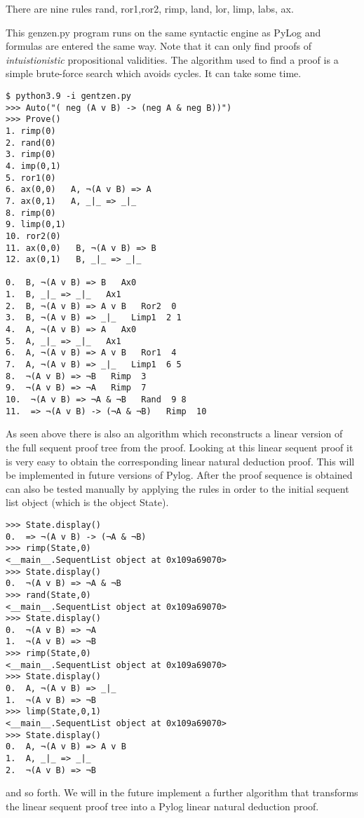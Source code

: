 \documentclass[12pt,leqno]{article}
\numberwithin{equation}{section}
\begin{document}
There are nine rules rand, ror1,ror2, rimp, land, lor, limp, labs, ax.

This genzen.py program runs on the same syntactic engine as PyLog and formulas are entered the same way. Note that it can only find proofs of \emph{intuistionistic} propositional validities.
The  algorithm  used to find a proof is a simple brute-force search which avoids cycles. It can take some time.

\begin{verbatim}
$ python3.9 -i gentzen.py
>>> Auto("( neg (A v B) -> (neg A & neg B))")
>>> Prove()
1. rimp(0)
2. rand(0)
3. rimp(0)
4. imp(0,1)
5. ror1(0)
6. ax(0,0)   A, ¬(A v B) => A
7. ax(0,1)   A, _|_ => _|_
8. rimp(0)
9. limp(0,1)
10. ror2(0)
11. ax(0,0)   B, ¬(A v B) => B
12. ax(0,1)   B, _|_ => _|_

0.  B, ¬(A v B) => B   Ax0  
1.  B, _|_ => _|_   Ax1  
2.  B, ¬(A v B) => A v B   Ror2  0 
3.  B, ¬(A v B) => _|_   Limp1  2 1 
4.  A, ¬(A v B) => A   Ax0  
5.  A, _|_ => _|_   Ax1  
6.  A, ¬(A v B) => A v B   Ror1  4 
7.  A, ¬(A v B) => _|_   Limp1  6 5 
8.  ¬(A v B) => ¬B   Rimp  3 
9.  ¬(A v B) => ¬A   Rimp  7 
10.  ¬(A v B) => ¬A & ¬B   Rand  9 8 
11.  => ¬(A v B) -> (¬A & ¬B)   Rimp  10 
\end{verbatim}

As seen above there  is also an algorithm which reconstructs a linear version of the full sequent proof tree from the proof. Looking at this
linear sequent proof it is very easy to obtain the corresponding linear natural deduction proof. This will be implemented in future versions of Pylog.
After the  proof sequence  is obtained can also be tested manually by applying the rules in order to the initial
sequent list object (which is the object State).

\begin{verbatim}
>>> State.display()
0.  => ¬(A v B) -> (¬A & ¬B)
>>> rimp(State,0)
<__main__.SequentList object at 0x109a69070>
>>> State.display()
0.  ¬(A v B) => ¬A & ¬B
>>> rand(State,0)
<__main__.SequentList object at 0x109a69070>
>>> State.display()
0.  ¬(A v B) => ¬A
1.  ¬(A v B) => ¬B
>>> rimp(State,0)
<__main__.SequentList object at 0x109a69070>
>>> State.display()
0.  A, ¬(A v B) => _|_
1.  ¬(A v B) => ¬B
>>> limp(State,0,1)
<__main__.SequentList object at 0x109a69070>
>>> State.display()
0.  A, ¬(A v B) => A v B
1.  A, _|_ => _|_
2.  ¬(A v B) => ¬B
\end{verbatim}

and so forth. We will in the future implement a further algorithm that transforms the linear sequent proof tree into a Pylog linear natural deduction proof.
\end{document}
